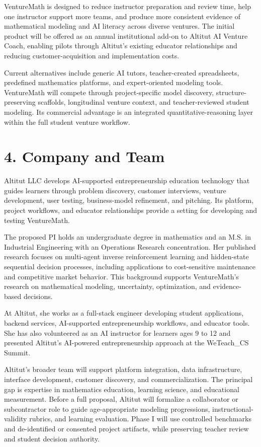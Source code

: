 VentureMath is designed to reduce instructor preparation and review time, help one instructor support more teams, and produce more consistent evidence of mathematical modeling and AI literacy across diverse ventures. The initial product will be offered as an annual institutional add-on to Altitut AI Venture Coach, enabling pilots through Altitut’s existing educator relationships and reducing customer-acquisition and implementation costs.

Current alternatives include generic AI tutors, teacher-created spreadsheets, predefined mathematics platforms, and expert-oriented modeling tools. VentureMath will compete through project-specific model discovery, structure-preserving scaffolds, longitudinal venture context, and teacher-reviewed student modeling. Its commercial advantage is an integrated quantitative-reasoning layer within the full student venture workflow.

\section{4. Company and Team}

Altitut LLC develops AI-supported entrepreneurship education technology that guides learners through problem discovery, customer interviews, venture development, user testing, business-model refinement, and pitching. Its platform, project workflows, and educator relationships provide a setting for developing and testing VentureMath.

The proposed PI holds an undergraduate degree in mathematics and an M.S. in Industrial Engineering with an Operations Research concentration. Her published research focuses on multi-agent inverse reinforcement learning and hidden-state sequential decision processes, including applications to cost-sensitive maintenance and competitive market behavior. This background supports VentureMath’s research on mathematical modeling, uncertainty, optimization, and evidence-based decisions.

At Altitut, she works as a full-stack engineer developing student applications, backend services, AI-supported entrepreneurship workflows, and educator tools. She has also volunteered as an AI instructor for learners ages 9 to 12 and presented Altitut’s AI-powered entrepreneurship approach at the WeTeach\_CS Summit.

Altitut’s broader team will support platform integration, data infrastructure, interface development, customer discovery, and commercialization. The principal gap is expertise in mathematics education, learning science, and educational measurement. Before a full proposal, Altitut will formalize a collaborator or subcontractor role to guide age-appropriate modeling progressions, instructional-validity rubrics, and learning evaluation. Phase I will use controlled benchmarks and de-identified or consented project artifacts, while preserving teacher review and student decision authority.


